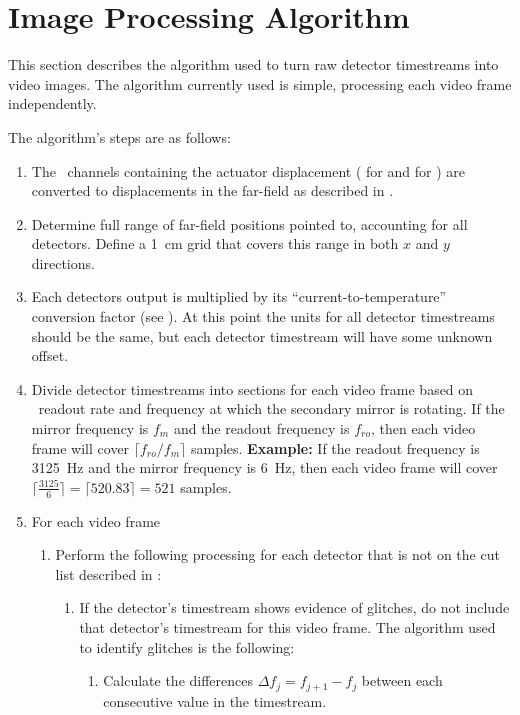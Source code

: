 \section{Image Processing Algorithm} \label{sec:ch8-algo}

This section describes the algorithm used to turn raw detector timestreams into video images.
The algorithm currently used is simple, processing each video frame independently.

The algorithm's steps are as follows:
\begin{enumerate}
\item The  \MCE\ channels containing the actuator displacement ( for  and  for ) are converted to displacements in the far-field as described in .
\item Determine full range of far-field positions pointed to, accounting for all detectors. Define a \SI{1}{\cm} grid that covers this range in both $x$ and $y$ directions.
\item Each detectors output is multiplied by its ``current-to-temperature'' conversion factor (see ). At this point the units for all detector timestreams should be the same, but each detector timestream will have some unknown offset.
\item Divide detector timestreams into sections for each video frame based on \MCE\ readout rate and frequency at which the secondary mirror is rotating.
  If the mirror frequency is $f_m$ and the readout frequency is $f_{ro}$, then each video frame will cover $\lceil f_{ro} / f_{m} \rceil$ samples.
  \textbf{Example:} If the readout frequency is \SI{3125}{\Hz} and the mirror frequency is \SI{6}{\Hz}, then each video frame will cover $\lceil\frac{3125}{6}\rceil = \lceil 520.83 \rceil = 521$ samples.
\item For each video frame
  \begin{enumerate}
  \item Perform the following processing for each detector that is not on the cut list described in :
    \begin{enumerate}
    \item If the detector's timestream shows evidence of glitches, do not include that detector's timestream for this video frame. The algorithm used to identify glitches is the following:
      \begin{enumerate}
      \item Calculate the differences $\Delta f_j = f_{j+1} - f_j$ between each consecutive value in the timestream.

\end{enumerate}
\end{enumerate}
\end{enumerate}
\end{enumerate}
